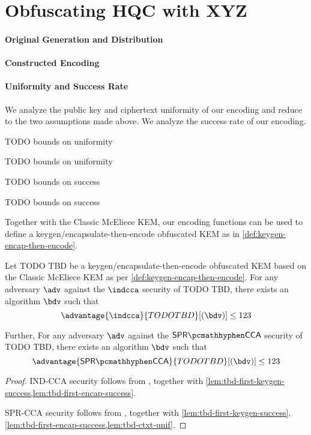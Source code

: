 \section{Obfuscating HQC with XYZ} \label{sec:tbd}
\paragraph{Original Generation and Distribution}
\paragraph{Constructed Encoding}
\paragraph{Uniformity and Success Rate}

We analyze the public key and ciphertext uniformity of our encoding and reduce to the two assumptions made above. We analyze the success rate of our encoding.

\begin{lemma} \label{lem:tbd-pk-unif}
    TODO bounds on uniformity
\end{lemma}

\begin{lemma} \label{lem:tbd-ctxt-unif}
    TODO bounds on uniformity
\end{lemma}

\begin{lemma} \label{lem:tbd-first-keygen-success}
    TODO bounds on success
\end{lemma}

\begin{lemma}[[First-encap success probability of TODO TBD] \label{lem:tbd-first-encap-success}
    TODO bounds on success
\end{lemma}

Together with the Classic McEliece KEM, our encoding functions can be used to define a keygen/encapsulate-then-encode obfuscated KEM as in \cref{def:keygen-encap-then-encode}.

\begin{theorem}
    Let TODO TBD be a keygen/encapsulate-then-encode obfuscated KEM based on the Classic McEliece KEM as per \cref{def:keygen-encap-then-encode}. For any adversary $\adv$ against the $\indcca$ security of TODO TBD, there exists an algorithm $\bdv$ such that
    \[ \advantage{\indcca}{TODO TBD}[(\bdv)] \leq 123 \]

    Further,  For any adversary $\adv$ against the $\sprcca$ security of TODO TBD, there exists an algorithm $\bdv$ such that
    \[ \advantage{\sprcca}{TODO TBD}[(\bdv)] \leq 123 \]
\end{theorem}
\begin{proof}
    IND-CCA security follows from \cite[Theorem~2.12]{CCS:GunSteVei24}, together with \cref{lem:tbd-first-keygen-success,lem:tbd-first-encap-success}.
    
    SPR-CCA security follows from \cite[Theorem~2.13]{CCS:GunSteVei24}, together with \cref{lem:tbd-first-keygen-success}, \ref{lem:tbd-first-encap-success,lem:tbd-ctxt-unif}.
\end{proof}